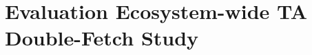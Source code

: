 \documentclass[conference]{IEEEtran} %
\newcommand{\sysname}{ScHMuzz\xspace}
\newcommand{\taemu}{TÄMU\xspace}
\newcommand{\stagetwo}{Fetch-Anchored Fuzzing\xspace} %
\newcommand{\stagethree}{Distillation\xspace}
\providecommand{\DIFaddtex}[1]{{\protect\color{blue} \sf #1}} %
\providecommand{\DIFdeltex}[1]{{\protect\color{red} \scriptsize #1}} %
\providecommand{\DIFaddbegin}{} %
\providecommand{\DIFaddend}{} %
\providecommand{\DIFdelbegin}{} %
\providecommand{\DIFdelend}{} %
\providecommand{\DIFadd}[1]{\texorpdfstring{\DIFaddtex{#1}}{#1}} %
\providecommand{\DIFdel}[1]{\texorpdfstring{\DIFdeltex{#1}}{}} %
\begin{document}
\DIFaddbegin 



\DIFaddend %
% 

\section{\DIFdelbegin \DIFdel{Evaluation}\DIFdelend \DIFaddbegin \DIFadd{Ecosystem-wide TA Double-Fetch Study}\DIFaddend }\DIFdelbegin %
\DIFdelend \DIFaddbegin \label{sec:ecostudy}
\DIFaddend %

\end{document}
